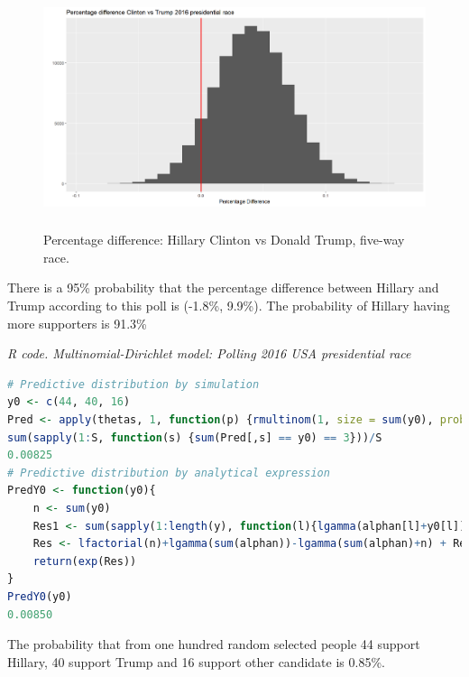 \begin{enumerate}[leftmargin=*]
\begin{figure}[!h]
	\includegraphics[width=340pt, height=200pt]{Chapters/chapter4/figures/hiillaryVStrump.png}
	\caption[List of figure caption goes here]{Percentage difference: Hillary Clinton vs Donald Trump, five-way race.}\label{fig41}
\end{figure}

There is a 95\% probability that the percentage difference between Hillary and Trump according to this poll is (-1.8\%, 9.9\%). The probability of Hillary having more supporters is 91.3\%


\begin{tcolorbox}[enhanced,width=4.67in,center upper,
	fontupper=\large\bfseries,drop shadow southwest,sharp corners]
	\textit{R code. Multinomial-Dirichlet model: Polling 2016 USA presidential race}
\begin{VF}
\begin{lstlisting}[language=R]
# Predictive distribution by simulation
y0 <- c(44, 40, 16)
Pred <- apply(thetas, 1, function(p) {rmultinom(1, size = sum(y0), prob = p)})
sum(sapply(1:S, function(s) {sum(Pred[,s] == y0) == 3}))/S
0.00825
# Predictive distribution by analytical expression
PredY0 <- function(y0){
	n <- sum(y0)
	Res1 <- sum(sapply(1:length(y), function(l){lgamma(alphan[l]+y0[l]) - lgamma(alphan[l])-lfactorial(y0[l])}))
	Res <- lfactorial(n)+lgamma(sum(alphan))-lgamma(sum(alphan)+n) + Res1
	return(exp(Res))
}
PredY0(y0)
0.00850         
\end{lstlisting}
\end{VF}
\end{tcolorbox} 

The probability that from one hundred random selected people 44 support Hillary, 40 support Trump and 16 support other candidate is 0.85\%.


\end{enumerate}
